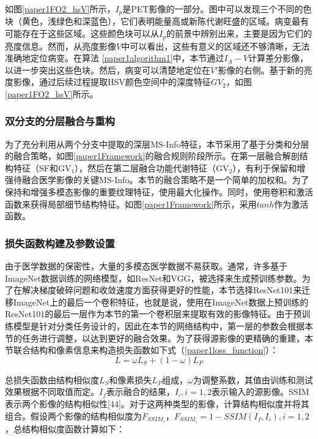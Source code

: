 如图\ref{paper1FO2_hsV}所示，$I_p$是PET影像的一部分。图中可以发现三个不同的色块（黄色，浅绿色和深蓝色），它们表明能量高或新陈代谢旺盛的区域。病变最有可能存在于这些区域。这些颜色块可以从$I_p$的前景中辨别出来，主要是因为它们的亮度信息。然而，从亮度影像$V$中可以看出，这些有意义的区域还不够清晰，无法准确地定位病变。在算法 \ref{paper1algorithm1}中，本节通过$I_A-V$计算差分影像，以进一步突出这些色块。然后，病变可以清楚地定位在$V'$影像的右侧。基于新的亮度影像，通过后续过程提取HSV颜色空间中的深度特征$GV_2$，如图\ref{paper1FO2_hsV}所示。
  
  
\subsubsection{双分支的分层融合与重构}
为了充分利用从两个分支中提取的深层MS-Info特征，本节采用了基于分类和分层的融合策略，如图\ref{paper1Framework}的融合规则阶段所示。在第一层融合解剖结构特征（SF和GV$_1$），然后在第二层融合功能代谢特征（GV$_2$），有利于保留和增强待融合医学影像的关键MS-Info。本节的融合策略不是一个简单的加权和。为了保持和增强多模态影像的重要纹理特征，使用最大化操作。同时，使用卷积和激活函数来获得局部细节结构特征。如图\ref{paper1Framework}所示，采用$tanh$作为激活函数。 


\subsubsection{损失函数构建及参数设置}
由于医学数据的保密性，大量的多模态医学数据不易获取。通常，许多基于ImageNet数据训练的网络模型，如ResNet\cite{2016Inception}和VGG\cite{2015Places205}，被选择来生成预训练参数。为了在解决梯度破碎问题和收敛速度方面获得更好的性能，本节选择ResNet101来迁移ImageNet上的最后一个卷积特征，也就是说，使用在ImageNet数据上预训练的ResNet101的最后一层作为本节的第一个卷积层来提取有效的影像特征。由于预训练模型是针对分类任务设计的，因此在本节的网络结构中，第一层的参数会根据本节的任务进行调整，以达到更好的融合效果。为了获得源影像的更精确的重建，本节联合结构和像素信息来构造损失函数如下式（\ref{paper1loss_function}）：
     \begin{equation}\label{paper1loss_function}
       L=\omega L_{S} + (1-\omega)L_{P}
      \end{equation}

总损失函数由结构相似度$L_{S}$和像素损失$L_{P}$组成，$\omega$为调整系数，其值由训练和测试效果根据不同取值而定。$I_f$表示融合的结果，$I_i,i=1,2$表示输入的源影像。SSIM表示两个影像的结构相似性[44]。对于这两种类型的影像，计算结构相似度并将其组合。假设两个影像的结构相似度为$F_{SSIM_i}$，$F_{SSIM_i}= 1-SSIM(I_f,I_i),i=1,2$，总结构相似度函数计算如下：


